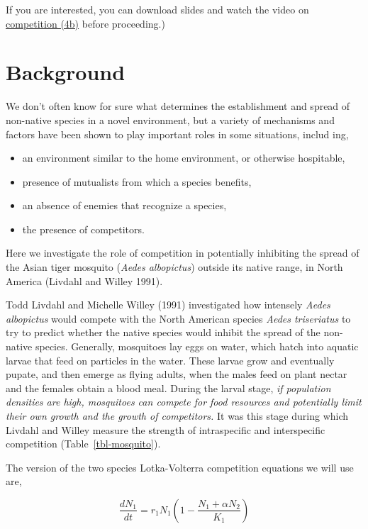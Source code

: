 \documentclass[
  letterpaper,
  DIV=11,
  numbers=noendperiod]{scrreprt}
\providecommand{\tightlist}{%
  \setlength{\itemsep}{0pt}\setlength{\parskip}{0pt}}
\begin{document}
If you are interested, you can download slides and watch the video on
\href{https://drive.google.com/drive/folders/1nWLoEGuWKIWdul9Uvse5qiB1Hf8MCwUv?usp=sharing}{competition
(4b)} before proceeding.)

\section{Background}\label{background-6}

We don't often know for sure what determines the establishment and
spread of non-native species in a novel environment, but a variety of
mechanisms and factors have been shown to play important roles in some
situations, includ ing,

\begin{itemize}
\tightlist
\item
  an environment similar to the home environment, or otherwise
  hospitable,
\item
  presence of mutualists from which a species benefits,
\item
  an absence of enemies that recognize a species,
\item
  the presence of competitors.
\end{itemize}

Here we investigate the role of competition in potentially inhibiting
the spread of the Asian tiger mosquito (\emph{Aedes albopictus}) outside
its native range, in North America (Livdahl and Willey 1991).

Todd Livdahl and Michelle Willey (1991) investigated how intensely
\emph{Aedes albopictus} would compete with the North American species
\emph{Aedes triseriatus} to try to predict whether the native species
would inhibit the spread of the non-native species. Generally,
mosquitoes lay eggs on water, which hatch into aquatic larvae that feed
on particles in the water. These larvae grow and eventually pupate, and
then emerge as flying adults, when the males feed on plant nectar and
the females obtain a blood meal. During the larval stage, \emph{if
population densities are high, mosquitoes can compete for food resources
and potentially limit their own growth and the growth of competitors.}
It was this stage during which Livdahl and Willey measure the strength
of intraspecific and interspecific competition
(Table~\ref{tbl-mosquito}).

The version of the two species Lotka-Volterra competition equations we
will use are,

\[\frac{dN_1}{dt} = r_1N_1 \left( 1- \frac{N_1 + \alpha N_2}{K_1}\right)\]
\end{document}
